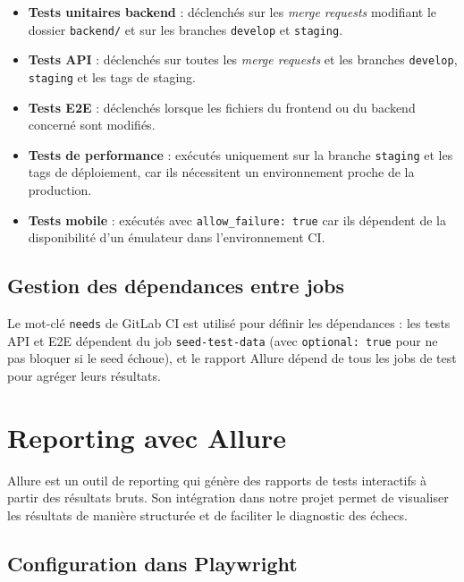 \begin{itemize}
  \item \textbf{Tests unitaires backend} : déclenchés sur les \textit{merge requests}
        modifiant le dossier \texttt{backend/} et sur les branches \texttt{develop}
        et \texttt{staging}.
  \item \textbf{Tests API} : déclenchés sur toutes les \textit{merge requests} et
        les branches \texttt{develop}, \texttt{staging} et les tags de staging.
  \item \textbf{Tests E2E} : déclenchés lorsque les fichiers du frontend ou du
        backend concerné sont modifiés.
  \item \textbf{Tests de performance} : exécutés uniquement sur la branche
        \texttt{staging} et les tags de déploiement, car ils nécessitent un
        environnement proche de la production.
  \item \textbf{Tests mobile} : exécutés avec \texttt{allow\_failure: true} car
        ils dépendent de la disponibilité d'un émulateur dans l'environnement CI.
\end{itemize}

\subsection{Gestion des dépendances entre jobs}

Le mot-clé \texttt{needs} de GitLab CI est utilisé pour définir les dépendances :
les tests API et E2E dépendent du job \texttt{seed-test-data} (avec
\texttt{optional: true} pour ne pas bloquer si le seed échoue), et le rapport Allure
dépend de tous les jobs de test pour agréger leurs résultats.

\section{Reporting avec Allure}
\label{sec:reporting-allure}

Allure est un outil de reporting qui génère des rapports de tests interactifs à partir
des résultats bruts. Son intégration dans notre projet permet de visualiser les résultats
de manière structurée et de faciliter le diagnostic des échecs.

\subsection{Configuration dans Playwright}

